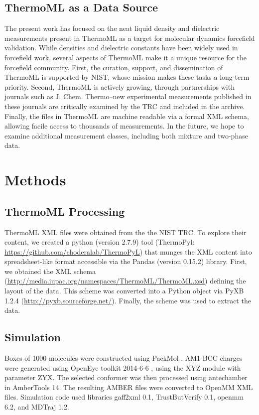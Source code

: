 \documentclass[journal=jacsat,manuscript=article]{achemso}
\begin{document}
\subsection{ThermoML as a Data Source}

The present work has focused on the neat liquid density and dielectric measurements present in ThermoML \cite{frenkel2006xml, frenkel2003thermoml, chirico2003thermoml} as a target for molecular dynamics forcefield validation.  While densities and dielectric constants have been widely used in forcefield work, several aspects of ThermoML make it a unique resource for the forcefield community.  First, the curation, support, and dissemination of ThermoML is supported by NIST, whose mission makes these tasks a long-term priority.  Second, ThermoML is actively growing, through partnerships with journals such as J. Chem. Thermo--new experimental measurements published in these journals are critically examined by the TRC and included in the archive.  Finally, the files in ThermoML are machine readable via a formal XML schema, allowing facile access to thousands of measurements.  In the future, we hope to examine additional measurement classes, including both mixture and two-phase data.


\section{Methods}

\subsection{ThermoML Processing}

ThermoML XML files were obtained from the the NIST TRC.  To explore their content, we created a python (version 2.7.9) tool (ThermoPyl: \url{https://github.com/choderalab/ThermoPyL}) that munges the XML content into spreadsheet-like format accessible via the  Pandas (version 0.15.2) library.  First, we obtained the XML schema (\url{http://media.iupac.org/namespaces/ThermoML/ThermoML.xsd}) defining the layout of the data.  This scheme was converted into a Python object via PyXB 1.2.4 (\url{http://pyxb.sourceforge.net/}).  Finally, the scheme was used to extract the data.  

\subsection{Simulation}
Boxes of 1000 molecules were constructed using PackMol \cite{martinez2009packmol}.  AM1-BCC charges were generated using OpenEye toolkit 2014-6-6 \cite{openeye}, using the XYZ module with parameter ZYX.  The selected conformer was then processed using antechamber in AmberTools 14.  The resulting AMBER files were converted to OpenMM \cite{eastman2012openmm} XML files.  Simulation code used libraries gaff2xml 0.1, TrustButVerify 0.1, openmm 6.2, and MDTraj \cite{mcgibbon2014mdtraj} 1.2.  
\end{document}
